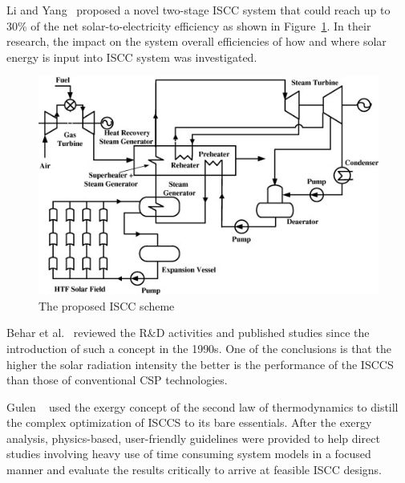Li and Yang~\cite{Li2014} proposed a novel two-stage ISCC system that could reach up to 30\% of the net solar-to-electricity efficiency as shown in Figure~\ref{fig:Li2014}. In their research, the impact on the system overall efficiencies of how and where solar energy is input into ISCC system was investigated.
\begin{figure}[!ht]
\centering
\includegraphics[width=.8\textwidth]{fig/Li2014.jpg}
\caption{The proposed ISCC scheme}\label{fig:Li2014}
\end{figure}

Behar et al.~\cite{Behar2014} reviewed the R\&D activities and published studies since the introduction of such a concept in the 1990s. One of the conclusions is that the higher the solar radiation intensity the better is the performance of the ISCCS than those of conventional CSP technologies.

Gulen ~\cite{Gulen2015} used the exergy concept of the second law of thermodynamics to distill the complex optimization of ISCCS to its bare essentials. After the exergy analysis, physics-based, user-friendly guidelines were provided to help direct studies involving heavy use of time consuming system models in a focused manner and evaluate the results critically to arrive at feasible ISCC designs.


